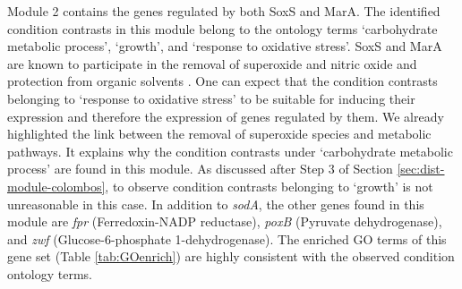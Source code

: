 Module 2 contains the genes regulated by both SoxS and MarA. The
identified condition contrasts in this module belong to the ontology
terms `carbohydrate metabolic process', `growth', and `response to
oxidative stress'. SoxS and MarA are known to participate in the removal
of superoxide and nitric oxide and protection from organic solvents
\cite{Touati2000}. 
One can expect that the condition contrasts belonging to `response
to oxidative stress' to be suitable for inducing their expression and
therefore the expression of genes regulated by them. We already
highlighted the link between the removal of superoxide species and
metabolic pathways. It explains why the condition contrasts under
`carbohydrate metabolic process' are found in this module. As discussed
after Step 3 of Section \ref{sec:dist-module-colombos}, to observe condition 
contrasts belonging to `growth' is not unreasonable in this case. 
In addition to \textit{sodA}, the other genes found in this module are 
\textit{fpr} (Ferredoxin-NADP reductase), \textit{poxB} (Pyruvate 
dehydrogenase), and \textit{zwf} (Glucose-6-phosphate 1-dehydrogenase). The 
enriched GO terms of this gene set (Table \ref{tab:GOenrich}) are highly 
consistent with the observed condition ontology terms.

